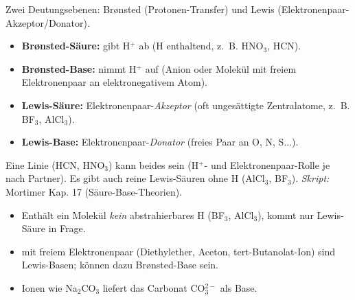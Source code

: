 

Zwei Deutungsebenen: Brønsted (Protonen-Transfer) und Lewis
(Elektronenpaar-Akzeptor/Donator).

\begin{werkzeugkasten}
\begin{itemize}
  \item \textbf{Brønsted-Säure:} gibt H$^+$ ab (H enthaltend, z.~B. HNO$_3$,
        HCN).
  \item \textbf{Brønsted-Base:} nimmt H$^+$ auf (Anion oder Molekül mit
        freiem Elektronenpaar an elektronegativem Atom).
  \item \textbf{Lewis-Säure:} Elektronenpaar-\emph{Akzeptor} (oft
        ungesättigte Zentralatome, z.~B. BF$_3$, AlCl$_3$).
  \item \textbf{Lewis-Base:} Elektronenpaar-\emph{Donator} (freies Paar an
        O, N, S...).
\end{itemize}
Eine Linie (HCN, HNO$_3$) kann beides sein (H$^+$- und Elektronenpaar-Rolle
je nach Partner). Es gibt auch reine Lewis-Säuren ohne H (AlCl$_3$, BF$_3$).
\textit{Skript:} Mortimer Kap. 17 (Säure-Base-Theorien).
\end{werkzeugkasten}

\begin{achtung}
\begin{itemize}
  \item Enthält ein Molekül \emph{kein} abstrahierbares H (BF$_3$,
        AlCl$_3$), kommt nur Lewis-Säure in Frage.
  \item mit freiem Elektronenpaar (Diethylether, Aceton, tert-Butanolat-Ion)
        sind Lewis-Basen; können dazu Brønsted-Base sein.
  \item Ionen wie Na$_2$CO$_3$ liefert das Carbonat CO$_3^{2-}$ als Base.
\end{itemize}
\end{achtung}
